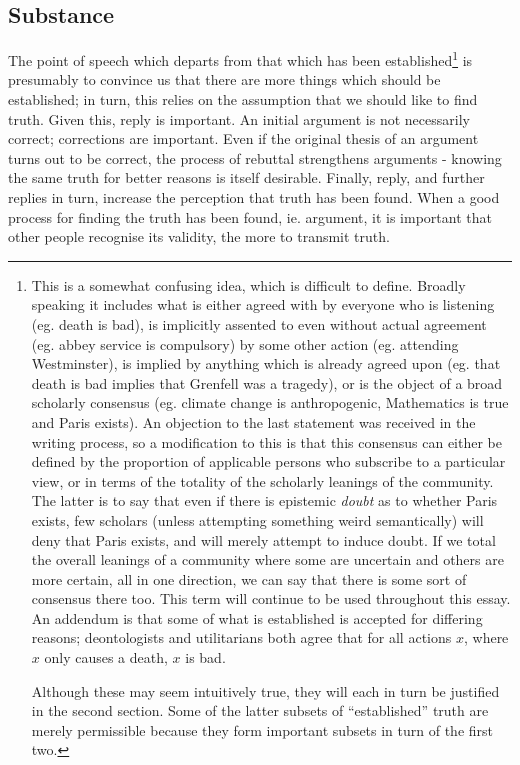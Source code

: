 \documentclass[10pt,a4paper]{article}
\begin{document}
\begin{multicols}{2}
	\section{Substance}\label{substance}
	
	The point of speech which departs from that which has been
	established\footnote{This is a somewhat confusing idea, which is
		difficult to define. Broadly speaking it includes what is either
		agreed with by everyone who is listening (eg. death is bad), is
		implicitly assented to even without actual agreement (eg. abbey
		service is compulsory) by some other action (eg. attending
		Westminster), is implied by anything which is already agreed upon (eg.
		that death is bad implies that Grenfell was a tragedy), or is the
		object of a broad scholarly consensus (eg. climate change is
		anthropogenic, Mathematics is true and Paris exists). An objection to
		the last statement was received in the writing process, so a
		modification to this is that this consensus can either be defined by
		the proportion of applicable persons who subscribe to a particular
		view, or in terms of the totality of the scholarly leanings of the
		community. The latter is to say that even if there is epistemic
		\textit{doubt} as to whether Paris exists, few scholars (unless
		attempting something weird semantically) will deny that Paris exists,
		and will merely attempt to induce doubt. If we total the overall
		leanings of a community where some are uncertain and others are more
		certain, all in one direction, we can say that there is some sort of
		consensus there too. This term will continue to be used throughout
		this essay. An addendum is that some of what is established is
		accepted for differing reasons; deontologists and utilitarians both
		agree that for all actions $x$, where $x$ only causes a
		death, $x$ is bad.
		
		Although these may seem intuitively true, they will each in turn be
		justified in the second section. Some of the latter subsets of
		``established'' truth are merely permissible because they form
		important subsets in turn of the first two.} is presumably to convince
	us that there are more things which should be established; in turn, this
	relies on the assumption that we should like to find truth. Given this,
	reply is important. An initial argument is not necessarily correct;
	corrections are important. Even if the original thesis of an argument
	turns out to be correct, the process of rebuttal strengthens arguments -
	knowing the same truth for better reasons is itself desirable. Finally,
	reply, and further replies in turn, increase the perception that truth
	has been found. When a good process for finding the truth has been
	found, ie. argument, it is important that other people recognise its
	validity, the more to transmit truth.
	

\end{multicols}
\end{document}
